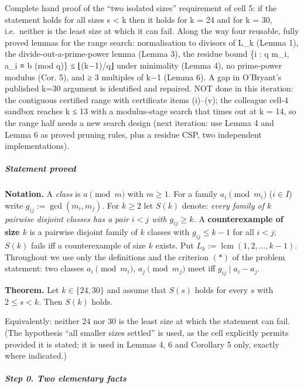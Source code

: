 
Complete hand proof of the ``two isolated sizes'' requirement of cell 5:
if the statement holds for all sizes s \textless{} k then it holds for k
= 24 and for k = 30, i.e.~neither is the least size at which it can
fail. Along the way four reusable, fully proved lemmas for the range
search: normalisation to divisors of L\_k (Lemma 1), the
divide-out-a-prime-power lemma (Lemma 3), the residue bound \textbar\{i
: q \textbar{} m\_i, a\_i ≡ b (mod q)\}\textbar{} ≤ ⌊(k−1)/q⌋ under
minimality (Lemma 4), no prime-power modulus (Cor. 5), and ≥ 3 multiples
of k−1 (Lemma 6). A gap in O'Bryant's published k=30 argument is
identified and repaired. NOT done in this iteration: the contiguous
certified range with certificate items (i)--(v); the colleague cell-4
sandbox reaches k ≤ 13 with a modulus-stage search that times out at k =
14, so the range half needs a new search design (next iteration: use
Lemma 4 and Lemma 6 as proved pruning rules, plus a residue CSP, two
independent implementations).


\subparagraph{Statement proved}\label{statement-proved}

\textbf{Notation.} A \emph{class} is \(a \pmod m\) with \(m\ge1\). For a
family \(a_i \pmod{m_i}\) (\(i\in I\)) write \(g_{ij}:=\gcd(m_i,m_j)\).
For \(k\ge2\) let \(S(k)\) denote: \emph{every family of \(k\) pairwise
disjoint classes has a pair \(i<j\) with \(g_{ij}\ge k\).} A
\textbf{counterexample of size \(k\)} is a pairwise disjoint family of
\(k\) classes with \(g_{ij}\le k-1\) for all \(i<j\); \(S(k)\) fails iff
a counterexample of size \(k\) exists. Put
\(L_k:=\operatorname{lcm}(1,2,\dots,k-1)\). Throughout we use only the
definitions and the criterion \((*)\) of the problem statement: two
classes \(a_i \pmod{m_i}\), \(a_j\pmod{m_j}\) meet iff
\(g_{ij}\mid a_i-a_j\).

\textbf{Theorem.} Let \(k\in\{24,30\}\) and assume that \(S(s)\) holds
for every \(s\) with \(2\le s<k\). Then \(S(k)\) holds.

Equivalently: neither \(24\) nor \(30\) is the least size at which the
statement can fail. (The hypothesis ``all smaller sizes settled'' is
used, as the cell explicitly permits provided it is stated; it is used
in Lemmas 4, 6 and Corollary 5 only, exactly where indicated.)

\subparagraph{Step 0. Two elementary
facts}\label{step-0.-two-elementary-facts}


